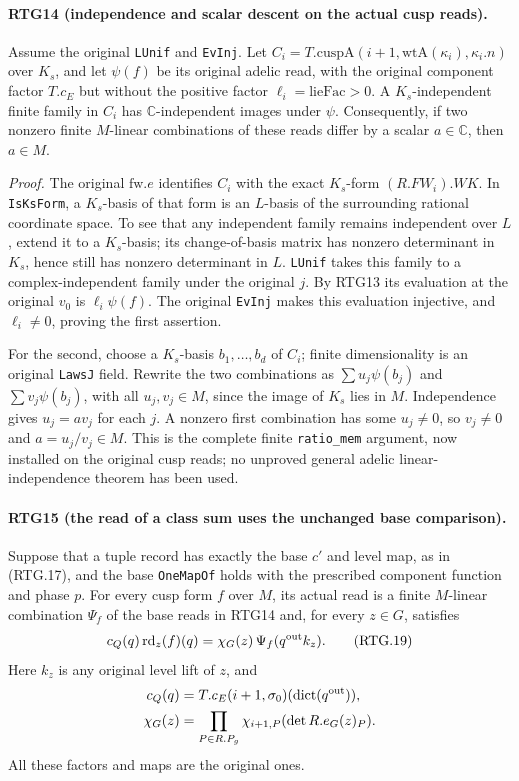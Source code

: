 \paragraph{RTG14 (independence and scalar descent on the actual cusp reads).}
\label{claim:RTG14}
Assume the original \texttt{LUnif} and \texttt{EvInj}.  Let
$C_i=T.\mathrm{cuspA}(i+1,\mathrm{wtA}(\kappa_i),\kappa_i.n)$ over
$K_s$, and let $\psi(f)$ be its original adelic read, with the original
component factor $T.c_E$ but without the positive factor
$\ell_i=\mathrm{lieFac}>0$.  A $K_s$-independent finite family in $C_i$
has $\mathbb C$-independent images under $\psi$.
Consequently, if two nonzero finite $M$-linear combinations of these
reads differ by a scalar $a\in\mathbb C$, then $a\in M$.

\emph{Proof.}
The original $\mathrm{fw}.e$ identifies $C_i$ with the exact
$K_s$-form $(R.FW_i).WK$.  In \texttt{IsKsForm}, a $K_s$-basis of
that form is an $L$-basis of the surrounding rational coordinate space.
To see that any independent family remains independent over $L$,
extend it to a $K_s$-basis; its change-of-basis matrix has nonzero
determinant in $K_s$, hence still has nonzero determinant in $L$.
\texttt{LUnif} takes this family to a complex-independent family under
the original $j$.  By RTG13 its evaluation at the original $v_0$ is
$\ell_i\psi(f)$.  The original \texttt{EvInj} makes this evaluation
injective, and $\ell_i\ne0$, proving the first assertion.

For the second, choose a $K_s$-basis $b_1,\ldots,b_d$ of $C_i$;
finite dimensionality is an original \texttt{LawsJ} field.
Rewrite the two combinations as $\sum u_j\psi(b_j)$ and
$\sum v_j\psi(b_j)$, with all $u_j,v_j\in M$, since the image of
$K_s$ lies in $M$.  Independence gives $u_j=av_j$ for each $j$.
A nonzero first combination has some $u_j\ne0$, so $v_j\ne0$ and
$a=u_j/v_j\in M$.  This is the complete finite \texttt{ratio\_\allowbreak mem}
argument, now installed on the original cusp reads; no unproved general
adelic linear-independence theorem has been used.

\paragraph{RTG15 (the read of a class sum uses the unchanged base comparison).}
\label{claim:RTG15}
Suppose that a tuple record has exactly the base $c'$ and level map,
as in (RTG.17), and the base \texttt{OneMapOf} holds with the prescribed
component function and phase $p$.  For every cusp form $f$ over $M$,
its actual read is a finite $M$-linear combination $\Psi_f$ of the
base reads in RTG14 and, for every $z\in G$, satisfies
\[
 c_Q(q)\,\mathrm{rd}_z(f)(q)
     =\chi_G(z)\,\Psi_f(q^{\rm out}k_z).                     \tag{RTG.19}
\]
Here $k_z$ is any original level lift of $z$, and
\[
 \begin{split}
 c_Q(q)&=T.c_E(i+1,\sigma_0)(\mathrm{dict}(q^{\rm out})),\\
 \chi_G(z)&=\prod_{P\in R.P_g}\chi_{i+1,P}(\det R.e_G(z)_P).
 \end{split}
\]
All these factors and maps are the original ones.


